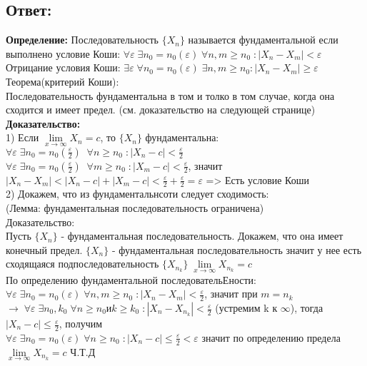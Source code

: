 \documentclass{article}
\DeclareMathOperator{\Exists}{\exists}
\begin{document}
\subsection*{Ответ:}
\textbf{Определение:} Последовательность $\{X_n\}$ называется фундаментальной если выполнено условие
Коши: $ \forall \varepsilon \; \Exists n_0 = n_0(\varepsilon) \; \forall n,m \geq n_0 \; :|X_n - X_m| < \varepsilon $\\
Отрицание условия Коши: $\exists \varepsilon \; \forall n_0 = n_0(\varepsilon) \; \exists n,m \geq n_0 :|X_n - X_m| \geq \varepsilon $\\
Теорема(критерий Коши):\\
Последовательность фундаментальна в том и толко в том случае, когда она сходится и имеет предел. (см. доказательство на следующей странице)
\newpage
\textbf{Доказательство:}\\
1) Если $\lim\limits_{x\to \infty} X_n = c$, то $\{X_n\}$ фундаментальна:\\
$ \forall \varepsilon \; \Exists n_0 = n_0(\frac{\varepsilon}{2}) \; \; \forall n \geq n_0 \; :|X_n - c| < \frac{\varepsilon}{2} $ \: $ \forall \varepsilon \; \Exists n_0 = n_0(\frac{\varepsilon}{2}) \; \; \forall m \geq n_0 \; :|X_m - c| < \frac{\varepsilon}{2} $, значит $|X_n - X_m| < |X_n - c| + |X_m - c| < \frac{\varepsilon}{2} + \frac{\varepsilon}{2} = \varepsilon $ => Есть условие Коши\\
2) Докажем, что из фундаментальнсоти следует сходимость:\\
(Лемма: фундаментальная последовательность ограничена)\\
Доказательство:\\
Пусть $\{X_n\}$ - фундаментальная последовательность. Докажем, что она имеет конечный предел. $\{X_n\}$ - фундаментальная последовательность значит у нее есть сходящаяся подпоследовательность $ \{X_{n_k}\} \; \lim\limits_{x\to \infty} X_{n_k} = c$ \\
По определению фундаментальной последовательЕности: $ \forall \varepsilon \; \Exists n_0 = n_0(\varepsilon) \; \forall n,m \geq n_0 \; :|X_n - X_m| < \frac{\varepsilon}{2}$, значит при $ m = n_k $ $\rightarrow\;  \forall \varepsilon \; \Exists n_0,k_0 \; \forall n \geq n_0 и k \geq k_0 \; :|X_n - X_{n_k}| < \frac{\varepsilon}{2}$ (устремим k к $\infty$), тогда $|X_n - c| \leq \frac{\varepsilon}{2}$, получим\\
$ \forall \varepsilon \; \Exists n_0 = n_0(\varepsilon)\; \forall n \geq n_0 \; :|X_n - c| \leq \frac{\varepsilon}{2} < \varepsilon$ значит по определению предела \; $\lim\limits_{x\to \infty} X_{n_k} = c$ Ч.Т.Д
\end{document}
